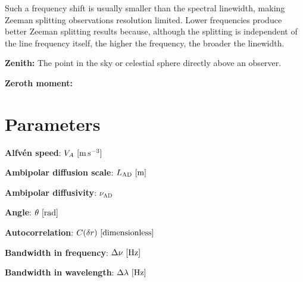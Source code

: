 \documentclass[a4paper,11pt]{article}
\begin{document}
{\noindent}Such a frequency shift is usually smaller than the spectral linewidth, making Zeeman splitting observations resolution limited. Lower frequencies produce better Zeeman splitting results because, although the splitting is independent of the line frequency itself, the higher the frequency, the broader the linewidth.

{\noindent}\textbf{Zenith:} The point in the sky or celestial sphere directly above an observer.

{\noindent}\textbf{Zeroth moment:} 









































\newpage
\section{Parameters}

{\noindent}\textbf{Alfv\'en speed}: $V_A~[{\rm m\,s^{-3}}]$

{\noindent}\textbf{Ambipolar diffusion scale}: $L_\mathrm{AD}~[{\rm m}]$

{\noindent}\textbf{Ambipolar diffusivity}: $\nu_\mathrm{AD}$

{\noindent}\textbf{Angle}: $\theta~[{\rm rad}]$

{\noindent}\textbf{Autocorrelation}: $C(\delta r)~[{\rm dimensionless}]$

{\noindent}\textbf{Bandwidth in frequency}: $\Delta\nu~[{\rm Hz}]$

{\noindent}\textbf{Bandwidth in wavelength}: $\Delta\lambda~[{\rm Hz}]$
\end{document}

